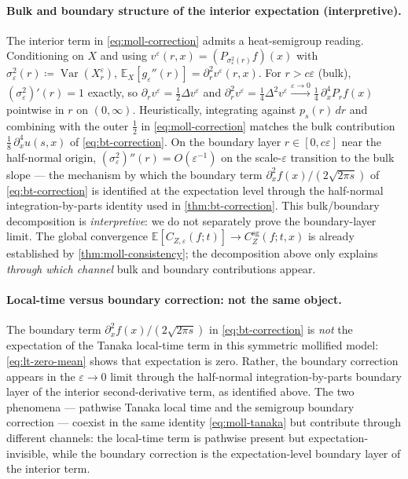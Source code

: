 \documentclass[11pt,reqno]{amsart}
\theoremstyle{plain}
\theoremstyle{definition}
\theoremstyle{remark}
\newcommand{\E}{\mathbb{E}}
\newcommand{\IBM}{Z}
\DeclareMathOperator{\Var}{Var}
\begin{document}
\paragraph{Bulk and boundary structure of the interior expectation
(interpretive).}
The interior term in \eqref{eq:moll-correction} admits a heat-semigroup
reading. Conditioning on $X$ and using
$v^\varepsilon(r,x)=(P_{\sigma_\varepsilon^{2}(r)}f)(x)$ with
$\sigma_\varepsilon^{2}(r)\coloneqq\Var(X^\varepsilon_r)$,
$\E_X[g_\varepsilon''(r)]=\partial_r^{2}v^\varepsilon(r,x)$. For
$r>c\varepsilon$ (bulk), $(\sigma_\varepsilon^{2})'(r)=1$ exactly, so
$\partial_r v^\varepsilon=\tfrac12\Delta v^\varepsilon$ and
$\partial_r^{2}v^\varepsilon=\tfrac14\Delta^{2}v^\varepsilon
\xrightarrow{\varepsilon\to 0}\tfrac14\,\partial_x^{4}P_rf(x)$ pointwise
in $r$ on $(0,\infty)$. Heuristically, integrating against
$p_s(r)\,dr$ and combining with the outer $\tfrac12$ in
\eqref{eq:moll-correction} matches the bulk contribution
$\tfrac18\,\partial_x^{4}u(s,x)$ of \eqref{eq:bt-correction}. On the
boundary layer $r\in[0,c\varepsilon]$ near the half-normal origin,
$(\sigma_\varepsilon^{2})''(r)=O(\varepsilon^{-1})$ on the
scale-$\varepsilon$ transition to the bulk slope --- the mechanism by
which the boundary term $\partial_x^{2}f(x)/(2\sqrt{2\pi s})$ of
\eqref{eq:bt-correction} is identified at the expectation level
through the half-normal integration-by-parts identity used in
\cref{thm:bt-correction}. This bulk/boundary decomposition is
\emph{interpretive}: we do not separately prove the boundary-layer
limit. The global convergence
$\E[C_{\IBM,\varepsilon}(f;t)]\to C_\IBM^{\mathrm{sg}}(f;t,x)$ is
already established by \cref{thm:moll-consistency}; the decomposition
above only explains \emph{through which channel} bulk and boundary
contributions appear.

\paragraph{Local-time versus boundary correction: not the same object.}
The boundary term $\partial_x^{2}f(x)/(2\sqrt{2\pi s})$ in
\eqref{eq:bt-correction} is \emph{not} the expectation of the
Tanaka local-time term in this symmetric mollified model:
\eqref{eq:lt-zero-mean} shows that expectation is zero. Rather, the
boundary correction appears in the $\varepsilon\to 0$ limit through
the half-normal integration-by-parts boundary layer of the interior
second-derivative term, as identified above. The two phenomena ---
pathwise Tanaka local time and the semigroup boundary correction
--- coexist in the same identity \eqref{eq:moll-tanaka} but
contribute through different channels: the local-time term is
pathwise present but expectation-invisible, while the boundary
correction is the expectation-level boundary layer of the interior
term.
\end{document}
